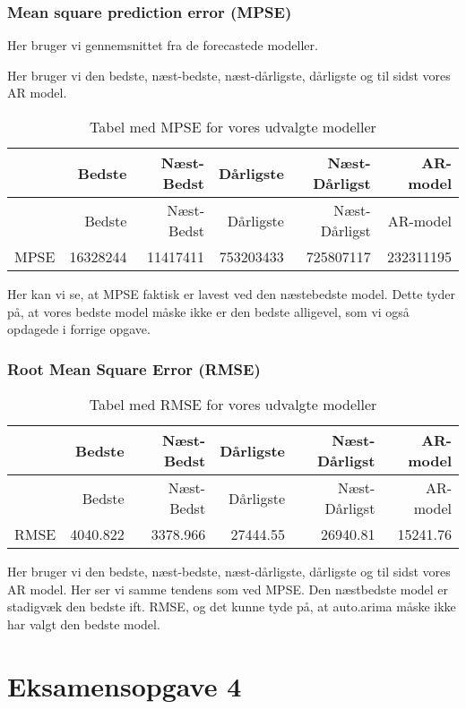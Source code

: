 \documentclass[
  10pt,
]{article}
\begin{document}
\hypertarget{mean-square-prediction-error-mpse}{%
\subsubsection{Mean square prediction error
(MPSE)}\label{mean-square-prediction-error-mpse}}

Her bruger vi gennemsnittet fra de forecastede modeller.

Her bruger vi den bedste, næst-bedste, næst-dårligste, dårligste og til
sidst vores AR model.

\begin{longtable}[]{@{}lrrrrr@{}}
\caption{Tabel med MPSE for vores udvalgte modeller}\tabularnewline
\toprule
& Bedste & Næst-Bedst & Dårligste & Næst-Dårligst &
AR-model\tabularnewline
\midrule
\endfirsthead
\toprule
& Bedste & Næst-Bedst & Dårligste & Næst-Dårligst &
AR-model\tabularnewline
\midrule
\endhead
MPSE & 16328244 & 11417411 & 753203433 & 725807117 &
232311195\tabularnewline
\bottomrule
\end{longtable}

Her kan vi se, at MPSE faktisk er lavest ved den næstebedste model.
Dette tyder på, at vores bedste model måske ikke er den bedste
alligevel, som vi også opdagede i forrige opgave.

\hypertarget{root-mean-square-error-rmse}{%
\subsubsection{Root Mean Square Error
(RMSE)}\label{root-mean-square-error-rmse}}

\begin{longtable}[]{@{}lrrrrr@{}}
\caption{Tabel med RMSE for vores udvalgte modeller}\tabularnewline
\toprule
& Bedste & Næst-Bedst & Dårligste & Næst-Dårligst &
AR-model\tabularnewline
\midrule
\endfirsthead
\toprule
& Bedste & Næst-Bedst & Dårligste & Næst-Dårligst &
AR-model\tabularnewline
\midrule
\endhead
RMSE & 4040.822 & 3378.966 & 27444.55 & 26940.81 &
15241.76\tabularnewline
\bottomrule
\end{longtable}

Her bruger vi den bedste, næst-bedste, næst-dårligste, dårligste og til
sidst vores AR model. Her ser vi samme tendens som ved MPSE. Den
næstbedste model er stadigvæk den bedste ift. RMSE, og det kunne tyde
på, at auto.arima måske ikke har valgt den bedste model.

\newpage

\hypertarget{eksamensopgave-4}{%
\section{Eksamensopgave 4}\label{eksamensopgave-4}}
\end{document}
